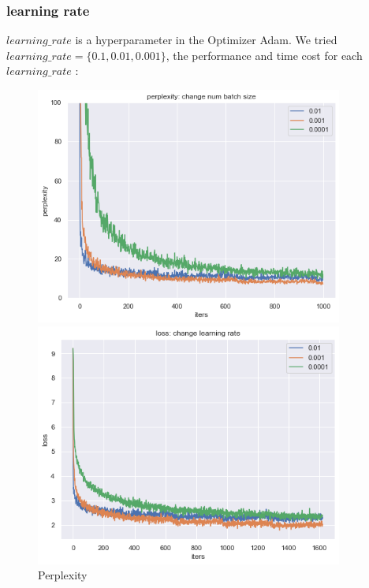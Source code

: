 \subsubsection{learning rate}
$learning\_rate$ is a hyperparameter in the Optimizer Adam. We tried $learning\_rate = \{0.1, 0.01, 0.001\}$, the performance and time cost for each $learning\_rate$ :
\begin{figure}[H]
    \centering 
    \begin{minipage}[b]{0.3\textwidth} 
    \centering 
    \includegraphics[width=0.9\textwidth]{p_learningrate.png}
    \caption{Perplexity} 
    \label{Fig.1}
    \end{minipage}
    \begin{minipage}[b]{0.3\textwidth}
    \centering 
    \includegraphics[width=0.9\textwidth]{l_learningrate.png}

\end{minipage}
\end{figure}
